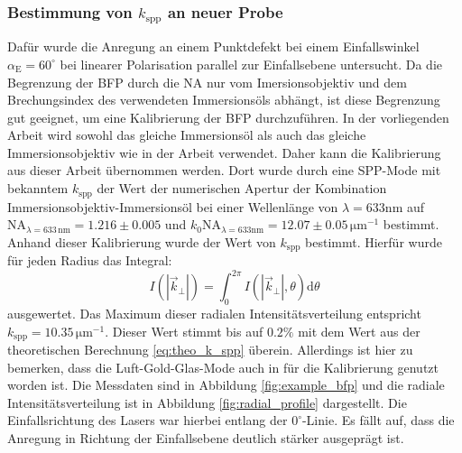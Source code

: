 \documentclass[titlepage,  ngerman]{article}
\begin{document}
	\subsubsection{Bestimmung von  $k_{\mathrm{spp}}$ an neuer Probe}
	Dafür wurde die Anregung an einem Punktdefekt bei einem Einfallswinkel $\alpha_{\mathrm{E}} = 60^\circ$ bei linearer Polarisation parallel zur Einfallsebene untersucht. Da die Begrenzung der BFP durch die NA nur vom Imersionsobjektiv und dem Brechungsindex des verwendeten Immersionsöls abhängt, ist diese Begrenzung gut geeignet, um eine Kalibrierung der BFP durchzuführen. In der vorliegenden Arbeit wird sowohl das gleiche Immersionsöl als auch das gleiche Immersionsobjektiv wie in der Arbeit\cite{Jaruschewski.2020} verwendet. Daher kann die Kalibrierung aus dieser Arbeit übernommen werden. Dort wurde durch eine SPP-Mode mit bekanntem $k_{\mathrm{spp}}$ der Wert der numerischen Apertur der Kombination Immersionsobjektiv-Immersionsöl bei einer Wellenlänge von $\lambda=633\mathrm{nm}$ auf $\mathrm{NA}_{\lambda = 633 \,\mathrm{nm}} = 1.216 \pm 0.005$  und $k_0\mathrm{NA}_{\lambda = 633 \mathrm{nm}} = 12.07 \pm 0.05\,\mathrm{\mu m}^{-1}$ bestimmt. Anhand dieser Kalibrierung wurde der Wert von $k_{\mathrm{spp}}$ bestimmt. Hierfür wurde für jeden Radius das Integral:
	$$ I\left(|\vec{k}_{\bot}|\right) = \int_{0}^{2 \pi} I\left(|\vec{k}_{\bot}|, \theta\right)\mathrm{d}\theta$$
	ausgewertet. Das Maximum dieser radialen Intensitätsverteilung entspricht $k_{\mathrm{spp}} = 10.35\,\mathrm{\mu m}^{-1}$.
	Dieser Wert stimmt bis auf $0.2\%$ mit dem Wert aus der theoretischen Berechnung \eqref{eq:theo_k_spp} überein. Allerdings ist hier zu bemerken, dass die Luft-Gold-Glas-Mode auch in \cite{Jaruschewski.2020} für die Kalibrierung genutzt worden ist. Die Messdaten sind in Abbildung \ref{fig:example_bfp} und die radiale Intensitätsverteilung ist in Abbildung \ref{fig:radial_profile} dargestellt. Die Einfallsrichtung des Lasers war hierbei entlang der $0^\circ$-Linie. Es fällt auf, dass die Anregung in Richtung der Einfallsebene deutlich stärker ausgeprägt ist. 
\end{document}
